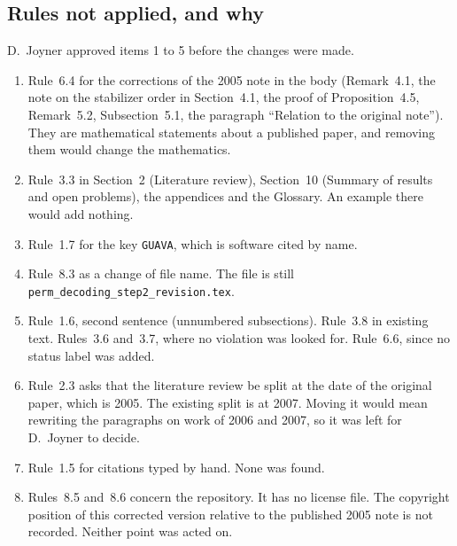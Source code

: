 \documentclass[12pt,letterpaper]{article}
\begin{document}
\subsection{Rules not applied, and why}
D.~Joyner approved items 1 to 5 before the changes were made.
\begin{enumerate}
\item Rule~6.4 for the corrections of the 2005 note in the body (Remark~4.1, the
note on the stabilizer order in Section~4.1, the proof of Proposition~4.5,
Remark~5.2, Subsection~5.1, the paragraph ``Relation to the original note'').
They are mathematical statements about a published paper, and removing them
would change the mathematics.
\item Rule~3.3 in Section~2 (Literature review), Section~10 (Summary of results
and open problems), the appendices and the Glossary. An example there would add
nothing.
\item Rule~1.7 for the key \texttt{GUAVA}, which is software cited by name.
\item Rule~8.3 as a change of file name. The file is still
\texttt{perm\_decoding\_step2\_revision.tex}.
\item Rule~1.6, second sentence (unnumbered subsections). Rule~3.8 in existing
text. Rules~3.6 and~3.7, where no violation was looked for. Rule~6.6, since no
status label was added.
\item Rule~2.3 asks that the literature review be split at the date of the
original paper, which is 2005. The existing split is at 2007. Moving it would mean
rewriting the paragraphs on work of 2006 and 2007, so it was left for
D.~Joyner to decide.
\item Rule~1.5 for citations typed by hand. None was found.
\item Rules~8.5 and~8.6 concern the repository. It has no license file. The
copyright position of this corrected version relative to the published 2005 note
is not recorded. Neither point was acted on.
\end{enumerate}
\end{document}
